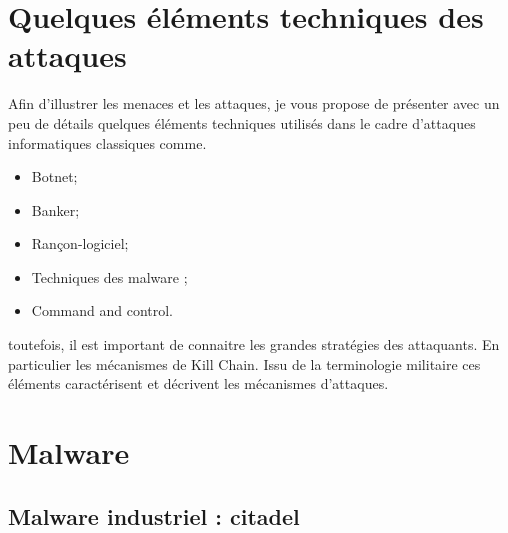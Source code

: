 %

\section{Quelques éléments techniques des attaques}

Afin d'illustrer les menaces et les attaques, je vous propose de présenter  avec un peu de détails quelques éléments techniques utilisés dans le cadre d'attaques informatiques classiques comme.

\begin{itemize}
  \item Botnet;
  \item Banker;
  \item Rançon-logiciel;
  \item  Techniques des malware ;
  \item Command and control.
\end{itemize}


toutefois, il est important de connaitre les grandes stratégies des attaquants.
En particulier les mécanismes de Kill Chain. Issu de la terminologie militaire ces éléments caractérisent et décrivent les mécanismes d'attaques.


%

\section{Malware}

\subsection{Malware industriel : citadel}

